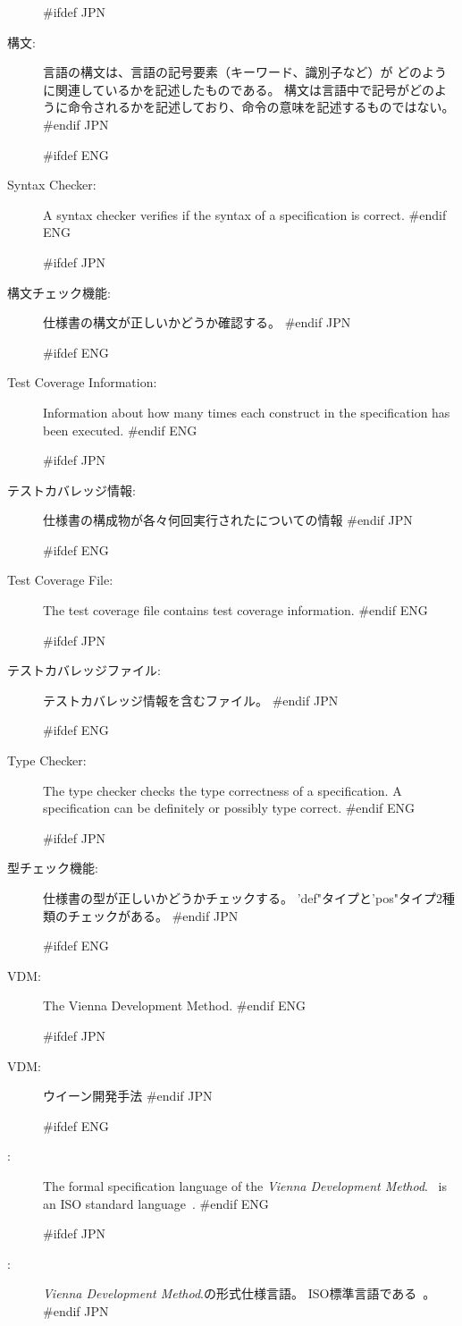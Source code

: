 \begin{description}
#ifdef JPN
\item[構文:] 言語の構文は、言語の記号要素（キーワード、識別子など）が
  どのように関連しているかを記述したものである。
  構文は言語中で記号がどのように命令されるかを記述しており、命令の意味を記述するものではない。
#endif JPN

#ifdef ENG
\item[Syntax Checker:] A syntax checker verifies if the syntax of a
  specification is correct.
#endif ENG

#ifdef JPN
\item[構文チェック機能:] 仕様書の構文が正しいかどうか確認する。
#endif JPN

#ifdef ENG
\item[Test Coverage Information:] Information about how many times
  each construct in the specification has been executed.
#endif ENG
  
#ifdef JPN
\item[テストカバレッジ情報:] 仕様書の構成物が各々何回実行されたについての情報
#endif JPN
  
#ifdef ENG
\item[Test Coverage File:] The test coverage file contains test
  coverage information.
#endif ENG
  
#ifdef JPN
\item[テストカバレッジファイル:] テストカバレッジ情報を含むファイル。
#endif JPN
  
#ifdef ENG
\item[Type Checker:] The type checker checks the type
  correctness of a specification. A specification can be definitely or
  possibly type correct.
#endif ENG

#ifdef JPN
\item[型チェック機能:] 仕様書の型が正しいかどうかチェックする。
  'def"タイプと'pos"タイプ2種類のチェックがある。
#endif JPN

#ifdef ENG
\item[VDM:] The Vienna Development Method.
#endif ENG

#ifdef JPN
\item[VDM:] ウイーン開発手法
#endif JPN

#ifdef ENG
\item[\vdmsl:] The formal specification language of the {\em Vienna
    Development Method}. \vdmsl\ is an ISO standard
  language~\cite{ISOVDM96}. 
#endif ENG

#ifdef JPN
\item[\vdmsl:] {\em Vienna Development Method}.の形式仕様言語。
  ISO標準言語である~\cite{ISOVDM96}。\\
#endif JPN


\end{description}
